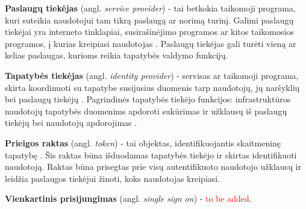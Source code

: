 \textbf{Paslaugų tiekėjas} (angl. \textit{service provider}) - tai betkokia taikomoji programa, kuri suteikia naudotojui tam tikrą paslaugą ar
norimą turinį. Galimi paslaugų tiekėjai yra interneto tinklapiai, susirašinėjimo programos ar kitos taikomosios programos,
į kurias kreipiasi naudotojas \cite{Pashalidis2003, Samar1999}. Paslaugų tiekėjas gali turėti vieną ar kelias paslaugas,
kurioms reikia tapatybės valdymo funkcijų.

\textbf{Tapatybės tiekėjas} (angl. \textit{identity provider}) - servisas ar taikomoji programa, skirta koordinuoti su tapatybe
susijusius duomenis tarp naudotojų, jų naršyklių bei paslaugų tiekėjų \cite{Strictest2011}. Pagrindinės tapatybės tiekėjo funkcijos:
infrastruktūros naudotojų tapatybės duomenims apdoroti sukūrimas ir užklausų iš paslaugų tiekėjų bei naudotojų apdorojimas \cite{Cao2010}.

\textbf{Prieigos raktas} (angl. \textit{token}) - tai objektas, identifikuojantis skaitmeninę tapatybę \cite{TokenDefinition}.
Šis raktas būna išduodamas tapatybės tiekėjo ir skirtas identifikuoti naudotoją. Raktas
būna prisegtas prie visų autentifikuoto naudotojo užklausų ir leidžia paslaugos tiekėjui žinoti, koks naudotojas kreipiasi.

\textbf{Vienkartinis prisijungimas} (angl. \textit{single sign on}) - \textcolor{red}{to be added}.
